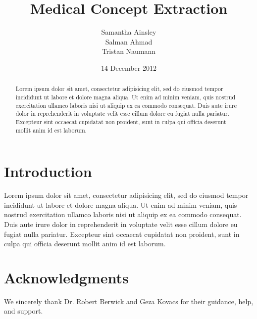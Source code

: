 \documentclass[preprint]{style}
\begin{document}
\title{Medical Concept Extraction}

\author{
\alignauthor
Samantha Ainsley\\
\alignauthor
Salman Ahmad\\
\alignauthor
Tristan Naumann\\
}

\date{14 December 2012}

\maketitle
\begin{abstract}

Lorem ipsum dolor sit amet, consectetur adipisicing elit, sed do eiusmod tempor incididunt ut labore et dolore magna aliqua. Ut enim ad minim veniam, quis nostrud exercitation ullamco laboris nisi ut aliquip ex ea commodo consequat. Duis aute irure dolor in reprehenderit in voluptate velit esse cillum dolore eu fugiat nulla pariatur. Excepteur sint occaecat cupidatat non proident, sunt in culpa qui officia deserunt mollit anim id est laborum. \cite{Wagner73}


\end{abstract}

\section{Introduction}
\label{sec:introduction}

Lorem ipsum dolor sit amet, consectetur adipisicing elit, sed do eiusmod tempor incididunt ut labore et dolore magna aliqua. Ut enim ad minim veniam, quis nostrud exercitation ullamco laboris nisi ut aliquip ex ea commodo consequat. Duis aute irure dolor in reprehenderit in voluptate velit esse cillum dolore eu fugiat nulla pariatur. Excepteur sint occaecat cupidatat non proident, sunt in culpa qui officia deserunt mollit anim id est laborum.



\section{Acknowledgments}
\label{sec:acknowledgments}

We sincerely thank Dr. Robert Berwick  and Geza Kovacs
for their guidance, help, and support.



%


\balancecolumns
\end{document}
